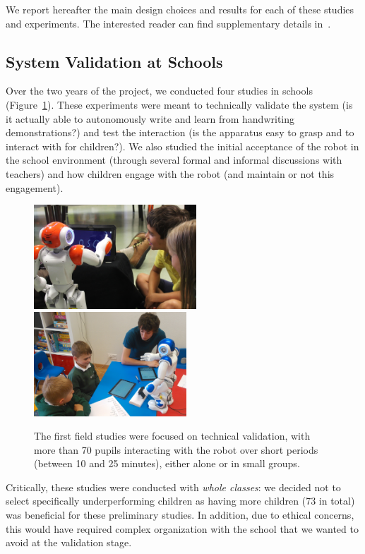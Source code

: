 \documentclass{article}
\begin{document}
We report hereafter the main design choices and results for each of these
studies and experiments. The interested reader can find supplementary details
in~\cite{jacq2016building, hood2015when}.

\subsection{System Validation at Schools}

Over the two years of the project, we conducted four studies in schools
(Figure~\ref{fig:schools}). These experiments were meant to technically validate
the system (is it actually able to autonomously write and learn from handwriting
demonstrations?) and test the interaction (is the apparatus easy to grasp and to
interact with for children?). We also studied the initial acceptance of the
robot in the school environment (through several formal and informal discussions
with teachers) and how children engage with the robot (and maintain or not this
engagement).

\begin{figure}
    \centering
    \includegraphics[height=3.9cm]{schools}
    \includegraphics[height=3.9cm]{schools2}
    \caption{\small The first field studies were focused on technical validation, with
    more than 70 pupils interacting with the robot over short periods (between
    10 and 25 minutes), either alone or in small groups.}
    \label{fig:schools}
\end{figure}

Critically, these studies were conducted with \emph{whole classes}: we decided
not to select specifically underperforming children as having more children (73
in total) was beneficial for these preliminary studies. In addition, due to ethical
concerns, this would have required complex organization with the school that we
wanted to avoid at the validation stage.
\end{document}
